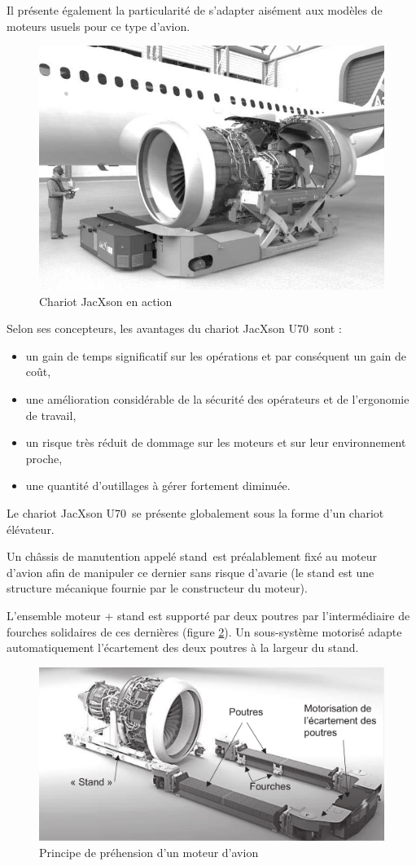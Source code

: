 Il présente également la particularité de s'adapter aisément aux modèles de moteurs usuels pour ce type d'avion.

\begin{figure}[ht!]
\begin{center}
 \includegraphics[width=0.5\linewidth]{img/fig01}
\end{center}
\caption{\label{fig01} Chariot JacXson en action}
\end{figure}

Selon ses concepteurs, les avantages du chariot \og JacXson U70\fg\ sont :
\begin{itemize}
 \item un gain de temps significatif sur les opérations et par conséquent un gain de coût,
 \item une amélioration considérable de la sécurité des opérateurs et de l'ergonomie de travail,
 \item un risque très réduit de dommage sur les moteurs et sur leur environnement proche,
 \item une quantité d'outillages à gérer fortement diminuée.
\end{itemize}

Le chariot \og JacXson U70\fg\ se présente globalement sous la forme d'un chariot élévateur.

Un châssis de manutention appelé \og stand\fg\ est préalablement fixé au moteur d'avion afin de manipuler ce dernier sans risque d'avarie (le stand est une structure mécanique fournie par le constructeur du moteur).

L'ensemble moteur + stand est supporté par deux poutres par l'intermédiaire de fourches solidaires de ces dernières (figure \ref{fig02}). Un sous-système motorisé adapte automatiquement l'écartement des deux poutres à la largeur du stand.

\begin{figure}[ht!]
\begin{center}
 \includegraphics[width=0.6\linewidth]{img/fig02}
\end{center}
\caption{\label{fig02} Principe de préhension d'un moteur d'avion}
\end{figure}

